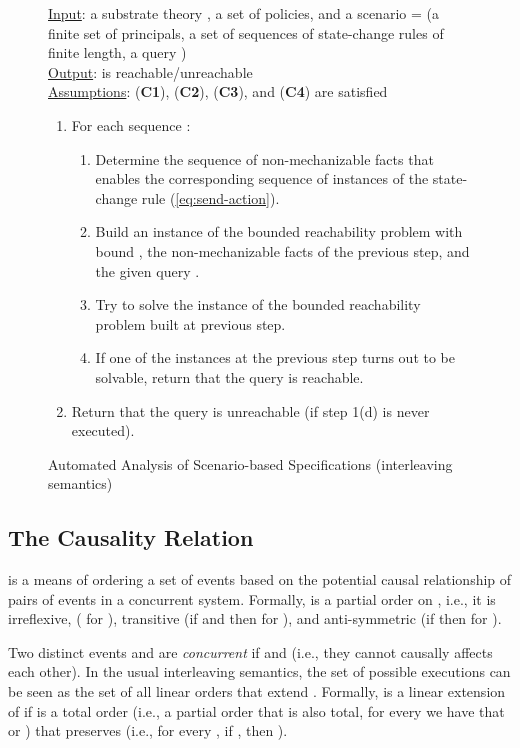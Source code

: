 \documentclass[conference]{llncs}
\begin{document}
{\begin{figure}[t]
\centering
\begin{minipage}{.9\textwidth}
\underline{\textsf{Input}}: a substrate theory , a set
 of policies, and a scenario = (a finite set  of
principals, a set  of sequences of state-change rules of
finite length, a query )\\
\underline{\textsf{Output}}:  is reachable/unreachable\\
\underline{\textsf{Assumptions}}:  (\textbf{C1}), (\textbf{C2}),
(\textbf{C3}), and  (\textbf{C4}) are satisfied
\begin{enumerate}
\item For each sequence :
\begin{enumerate}
  \item Determine the sequence  of
    non-mechanizable facts that enables the corresponding sequence of
    instances of the state-change rule (\ref{eq:send-action}).
  \item Build an instance of the bounded reachability problem with
    bound , the non-mechanizable facts of the previous
    step, and the given query .
  \item Try to solve the instance of the bounded reachability problem
    built at previous step.
\item If one of the instances at the previous step turns out to be
    solvable, return that the query  is reachable.
\end{enumerate}
\item Return that the query  is unreachable (if step 1(d) is never executed).
\end{enumerate}
\end{minipage}
\caption{\label{fig:automated-analysis}Automated Analysis of Scenario-based Specifications (interleaving semantics)}
\end{figure}


\subsection{The Causality Relation} 
 is a means of ordering a set
 of events based on the potential causal relationship of pairs of
events in a concurrent system. Formally,  is a partial order
on , i.e., it is irreflexive, ( for ),
transitive  
(if  and  then  for ), and 
anti-symmetric (if  then  for ). 

Two distinct events
 and  are \emph{concurrent} if  and
 (i.e., they cannot causally affects each other). 
In the usual interleaving semantics, the set of possible executions can be seen as the set of all
linear orders that extend . Formally,  is a linear
extension of  if  is a total order 
(i.e., a partial order that is also total, for every  we have that
 or ) 
that preserves  (i.e., for every , if , then ). 

}
\end{document}
